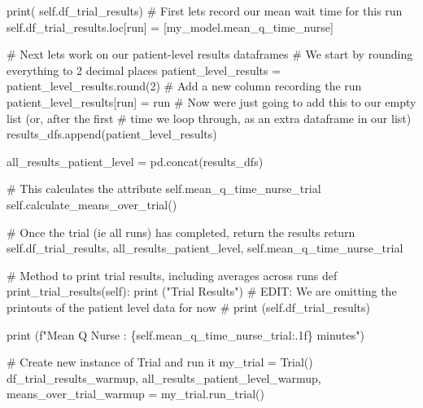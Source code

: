 \documentclass[
  letterpaper,
  DIV=11,
  numbers=noendperiod]{scrreprt}
\newenvironment{Shaded}{\begin{snugshade}}{\end{snugshade}}
\newcommand{\BuiltInTok}[1]{\textcolor[rgb]{0.00,0.23,0.31}{#1}}
\newcommand{\CommentTok}[1]{\textcolor[rgb]{0.37,0.37,0.37}{#1}}
\newcommand{\ControlFlowTok}[1]{\textcolor[rgb]{0.00,0.23,0.31}{#1}}
\newcommand{\DecValTok}[1]{\textcolor[rgb]{0.68,0.00,0.00}{#1}}
\newcommand{\KeywordTok}[1]{\textcolor[rgb]{0.00,0.23,0.31}{#1}}
\newcommand{\NormalTok}[1]{\textcolor[rgb]{0.00,0.23,0.31}{#1}}
\newcommand{\OperatorTok}[1]{\textcolor[rgb]{0.37,0.37,0.37}{#1}}
\newcommand{\SpecialCharTok}[1]{\textcolor[rgb]{0.37,0.37,0.37}{#1}}
\newcommand{\SpecialStringTok}[1]{\textcolor[rgb]{0.13,0.47,0.30}{#1}}
\newcommand{\StringTok}[1]{\textcolor[rgb]{0.13,0.47,0.30}{#1}}
\newcommand{\VariableTok}[1]{\textcolor[rgb]{0.07,0.07,0.07}{#1}}
\begin{document}
\begin{Shaded}
\begin{Highlighting}[]
            \BuiltInTok{print}\NormalTok{( }\VariableTok{self}\NormalTok{.df\_trial\_results)}
            \CommentTok{\# First let\textquotesingle{}s record our mean wait time for this run}
            \VariableTok{self}\NormalTok{.df\_trial\_results.loc[run] }\OperatorTok{=}\NormalTok{ [my\_model.mean\_q\_time\_nurse]}

            \CommentTok{\# Next let\textquotesingle{}s work on our patient{-}level results dataframes}
            \CommentTok{\# We start by rounding everything to 2 decimal places}
\NormalTok{            patient\_level\_results }\OperatorTok{=}\NormalTok{ patient\_level\_results.}\BuiltInTok{round}\NormalTok{(}\DecValTok{2}\NormalTok{)}
            \CommentTok{\# Add a new column recording the run}
\NormalTok{            patient\_level\_results[}\StringTok{\textquotesingle{}run\textquotesingle{}}\NormalTok{] }\OperatorTok{=}\NormalTok{ run}
            \CommentTok{\# Now we\textquotesingle{}re just going to add this to our empty list (or, after the first}
            \CommentTok{\# time we loop through, as an extra dataframe in our list)}
\NormalTok{            results\_dfs.append(patient\_level\_results)}

\NormalTok{        all\_results\_patient\_level }\OperatorTok{=}\NormalTok{ pd.concat(results\_dfs)}

        \CommentTok{\# This calculates the attribute self.mean\_q\_time\_nurse\_trial}
        \VariableTok{self}\NormalTok{.calculate\_means\_over\_trial()}

        \CommentTok{\# Once the trial (ie all runs) has completed, return the results}
        \ControlFlowTok{return} \VariableTok{self}\NormalTok{.df\_trial\_results, all\_results\_patient\_level, }\VariableTok{self}\NormalTok{.mean\_q\_time\_nurse\_trial}

    \CommentTok{\# Method to print trial results, including averages across runs}
    \KeywordTok{def}\NormalTok{ print\_trial\_results(}\VariableTok{self}\NormalTok{):}
        \BuiltInTok{print}\NormalTok{ (}\StringTok{"Trial Results"}\NormalTok{)}
        \CommentTok{\# EDIT: We are omitting the printouts of the patient level data for now}
        \CommentTok{\# print (self.df\_trial\_results)}

        \BuiltInTok{print}\NormalTok{ (}\SpecialStringTok{f"Mean Q Nurse : }\SpecialCharTok{\{}\VariableTok{self}\SpecialCharTok{.}\NormalTok{mean\_q\_time\_nurse\_trial}\SpecialCharTok{:.1f\}}\SpecialStringTok{ minutes"}\NormalTok{)}

\CommentTok{\# Create new instance of Trial and run it}
\NormalTok{my\_trial }\OperatorTok{=}\NormalTok{ Trial()}
\NormalTok{df\_trial\_results\_warmup, all\_results\_patient\_level\_warmup, means\_over\_trial\_warmup }\OperatorTok{=}\NormalTok{ my\_trial.run\_trial()}
\end{Highlighting}
\end{Shaded}
\end{document}

